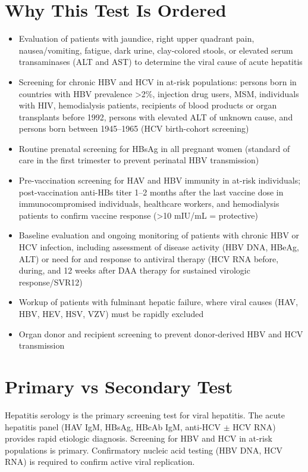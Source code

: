 \section*{Why This Test Is Ordered}
\begin{itemize}
  \item Evaluation of patients with jaundice, right upper quadrant pain, nausea/vomiting, fatigue, dark urine, clay-colored stools, or elevated serum transaminases (ALT and AST) to determine the viral cause of acute hepatitis
  \item Screening for chronic HBV and HCV in at-risk populations: persons born in countries with HBV prevalence >2\%, injection drug users, MSM, individuals with HIV, hemodialysis patients, recipients of blood products or organ transplants before 1992, persons with elevated ALT of unknown cause, and persons born between 1945--1965 (HCV birth-cohort screening) \cite{cdc2012recommendations}
  \item Routine prenatal screening for HBsAg in all pregnant women (standard of care in the first trimester to prevent perinatal HBV transmission) \cite{schillie2018prevention}
  \item Pre-vaccination screening for HAV and HBV immunity in at-risk individuals; post-vaccination anti-HBs titer 1--2 months after the last vaccine dose in immunocompromised individuals, healthcare workers, and hemodialysis patients to confirm vaccine response (>10 mIU/mL = protective)
  \item Baseline evaluation and ongoing monitoring of patients with chronic HBV or HCV infection, including assessment of disease activity (HBV DNA, HBeAg, ALT) or need for and response to antiviral therapy (HCV RNA before, during, and 12 weeks after DAA therapy for sustained virologic response/SVR12)
  \item Workup of patients with fulminant hepatic failure, where viral causes (HAV, HBV, HEV, HSV, VZV) must be rapidly excluded
  \item Organ donor and recipient screening to prevent donor-derived HBV and HCV transmission
\end{itemize}

\section*{Primary vs Secondary Test}
Hepatitis serology is the primary screening test for viral hepatitis. The acute hepatitis panel (HAV IgM, HBsAg, HBcAb IgM, anti-HCV $\pm$ HCV RNA) provides rapid etiologic diagnosis. Screening for HBV and HCV in at-risk populations is primary. Confirmatory nucleic acid testing (HBV DNA, HCV RNA) is required to confirm active viral replication.

